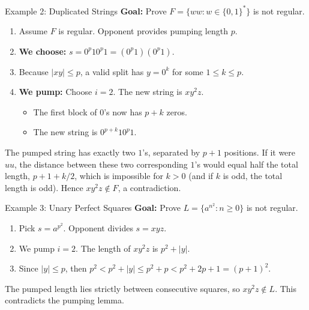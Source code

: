 \documentclass[10pt]{beamer}
\begin{document}
\begin{frame}{Example 2: Duplicated Strings}
  \small
  \textbf{Goal:} Prove
  $F=\{ww:w\in\{0,1\}^{*}\}$ is not regular.
  \pause
  
  \begin{enumerate}
      \item Assume $F$ is regular. Opponent provides pumping length $p$.
      \pause
      \item \textbf{We choose:} $s=0^p10^p1=(0^p1)(0^p1)$.
      \pause
      \item Because $|xy|\leq p$, a valid split has $y=0^k$ for some
        $1\leq k\leq p$.
      \pause
      \item \textbf{We pump:} Choose $i = 2$. The new string is $xy^2z$.
      \begin{itemize}
          \item The first block of $0$'s now has $p+k$ zeros.
          \item The new string is $0^{p+k} 1 0^p 1$.
      \end{itemize}
  \end{enumerate}
  \pause
  The pumped string has exactly two $1$'s, separated by $p+1$ positions. If it
  were $uu$, the distance between these two corresponding $1$'s would equal
  half the total length, $p+1+k/2$, which is impossible for $k>0$ (and if $k$
  is odd, the total length is odd). Hence $xy^2z\notin F$, a contradiction.
\end{frame}

\begin{frame}{Example 3: Unary Perfect Squares}
  \small
  \textbf{Goal:} Prove
  $L=\{a^{n^2}:n\geq0\}$ is not regular.
  \pause
  
  \begin{center}
  \end{center}
  \pause
  
  \begin{enumerate}
      \item Pick $s = a^{p^2}$. Opponent divides $s = xyz$.
      \item We pump $i=2$. The length of $xy^2z$ is $p^2 + |y|$.
      \item Since $|y| \leq p$, then
        $p^2<p^2+|y|\leq p^2+p<p^2+2p+1=(p+1)^{2}$.
  \end{enumerate}
  \pause
  The pumped length lies strictly between consecutive squares, so
  $xy^2z\notin L$. This contradicts the pumping lemma.
\end{frame}
\end{document}
